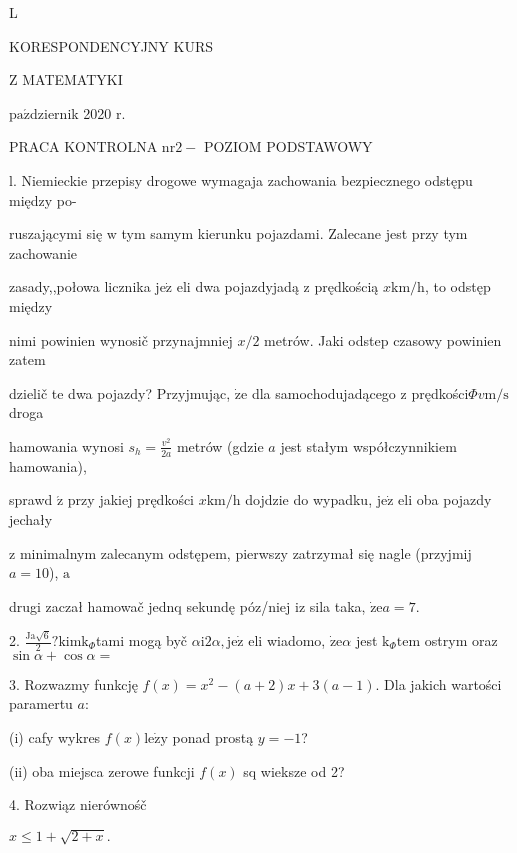 \documentclass[a4paper,12pt]{article}
\begin{document}
L

KORESPONDENCYJNY KURS

Z MATEMATYKI

$\mathrm{p}\mathrm{a}\acute{\mathrm{z}}$dziernik 2020 $\mathrm{r}.$

PRACA KONTROLNA $\mathrm{n}\mathrm{r} 2-$ POZIOM PODSTAWOWY

l. Niemieckie przepisy drogowe wymagaja zachowania bezpiecznego odstępu między po-

ruszającymi się $\mathrm{w}$ tym samym kierunku pojazdami. Zalecane jest przy tym zachowanie

zasady,,połowa licznika $\mathrm{j}\mathrm{e}\dot{\mathrm{z}}$ eli dwa pojazdyjadą $\mathrm{z}$ prędkością $x\mathrm{k}\mathrm{m}/\mathrm{h}$, to odstęp między

nimi powinien wynosič przynajmniej $x/2$ metrów. Jaki odstep czasowy powinien zatem

dzielič te dwa pojazdy? Przyjmując, $\dot{\mathrm{z}}\mathrm{e}$ dla samochodujadącego $\mathrm{z}$ prędkości$\Phi v\mathrm{m}/\mathrm{s}$ droga

hamowania wynosi $s_{h}=\displaystyle \frac{v^{2}}{2a}$ metrów (gdzie $a$ jest stałym współczynnikiem hamowania),

sprawd $\acute{\mathrm{z}}$ przy jakiej prędkości $x\mathrm{k}\mathrm{m}/\mathrm{h}$ dojdzie do wypadku, $\mathrm{j}\mathrm{e}\dot{\mathrm{z}}$ eli oba pojazdy jechały

$\mathrm{z}$ minimalnym zalecanym odstępem, pierwszy zatrzymał się nagle (przyjmij $a=10$), $\mathrm{a}$

drugi zaczał hamowač jednq sekundę póz/niej $\mathrm{i}\mathrm{z}$ sila taka, $\dot{\mathrm{z}}\mathrm{e}a=7.$

2. $\displaystyle \frac{\mathrm{J}\mathrm{a}\sqrt{6}}{2}?\mathrm{k}\mathrm{i}\mathrm{m}\mathrm{k}_{\Phi}$tami mogą byč $\alpha \mathrm{i}2\alpha, \mathrm{j}\mathrm{e}\dot{\mathrm{z}}$ eli wiadomo, $\dot{\mathrm{z}}\mathrm{e}\alpha$ jest $\mathrm{k}_{\Phi}\mathrm{t}\mathrm{e}\mathrm{m}$ ostrym oraz $\sin\alpha+\cos\alpha=$

$3$. Rozwazmy funkcję $f(x)=x^{2}-(a+2)x+3(a-1)$. Dla jakich wartości paramertu $a$:

(i) cafy wykres $f(x)\mathrm{l}\mathrm{e}\dot{\mathrm{z}}\mathrm{y}$ ponad prostą $y=-1$?

(ii) oba miejsca zerowe funkcji $f(x)$ sq wieksze od 2?

4. Rozwiąz nierównośč

$x\leq 1+\sqrt{2+x}.$
\end{document}
